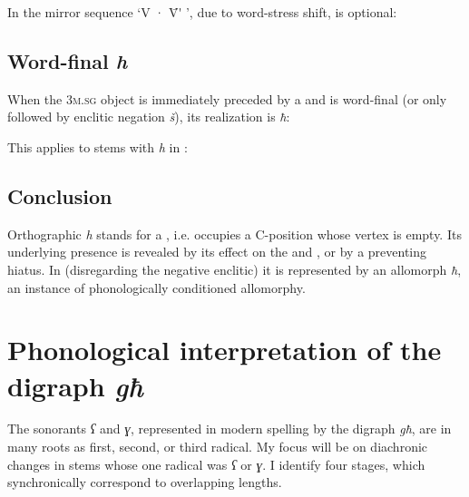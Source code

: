 \documentclass[output=paper]{langsci/langscibook}
\begin{document}
In the mirror sequence ‘V · \={V}\'{} ’, due to word-stress shift,  is optional:

\ea%
\puechquadruple{ ~}{ [štray\'{ī}li] }{ ~}{ ~}
\z

\subsection{Word-final \textit{h}}
When the 3\textsc{m.sg} object  is immediately preceded by a  and is word-final (or only followed by enclitic negation \textit{š}), its  realization is \textit{ħ}:

\ea%
    \label{ex:puech:43}
    \z

This applies to stems with  \textit{h} in : 

\ea%
    \label{ex:puech:44}
    \z


\subsection{Conclusion}
Orthographic \textit{h} stands for a , i.e. occupies a C-position whose vertex is empty. Its underlying presence is revealed by its effect on the  and , or by a  preventing hiatus. In  (disregarding the negative enclitic) it is represented by an allomorph \textit{ħ}, an instance of phonologically conditioned allomorphy.

\section{Phonological interpretation of the digraph \textit{għ}}

The sonorants \textit{ʕ} and \textit{ɣ}, represented in modern spelling by the digraph \textit{għ}, are  in many roots as first, second, or third radical. My focus will be on diachronic changes in stems whose one radical was \textit{ʕ} or \textit{ɣ}. I identify four stages, which synchronically correspond to overlapping lengths. %
\end{document}
